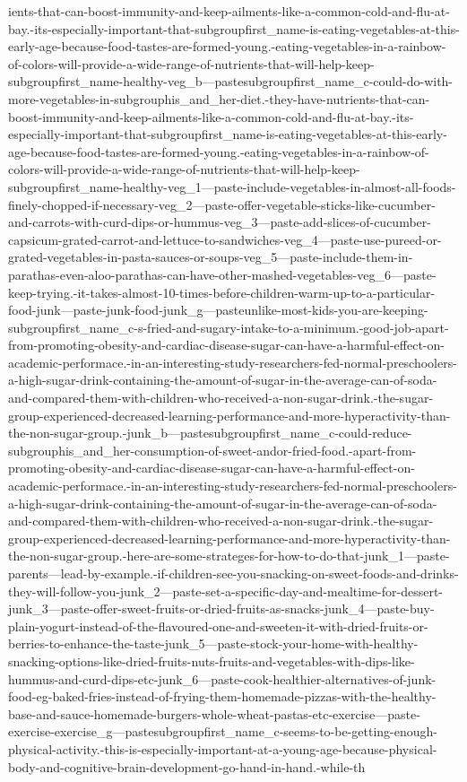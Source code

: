 \documentclass[]{article}
\begin{document}
ients-that-can-boost-immunity-and-keep-ailments-like-a-common-cold-and-flu-at-bay.-its-especially-important-that-subgroupfirst_name-is-eating-vegetables-at-this-early-age-because-food-tastes-are-formed-young.-eating-vegetables-in-a-rainbow-of-colors-will-provide-a-wide-range-of-nutrients-that-will-help-keep-subgroupfirst_name-healthy-veg_b---pastesubgroupfirst_name_c-could-do-with-more-vegetables-in-subgrouphis_and_her-diet.-they-have-nutrients-that-can-boost-immunity-and-keep-ailments-like-a-common-cold-and-flu-at-bay.-its-especially-important-that-subgroupfirst_name-is-eating-vegetables-at-this-early-age-because-food-tastes-are-formed-young.-eating-vegetables-in-a-rainbow-of-colors-will-provide-a-wide-range-of-nutrients-that-will-help-keep-subgroupfirst_name-healthy-veg_1---paste-include-vegetables-in-almost-all-foods-finely-chopped-if-necessary-veg_2---paste-offer-vegetable-sticks-like-cucumber-and-carrots-with-curd-dips-or-hummus-veg_3---paste-add-slices-of-cucumber-capsicum-grated-carrot-and-lettuce-to-sandwiches-veg_4---paste-use-pureed-or-grated-vegetables-in-pasta-sauces-or-soups-veg_5---paste-include-them-in-parathas-even-aloo-parathas-can-have-other-mashed-vegetables-veg_6---paste-keep-trying.-it-takes-almost-10-times-before-children-warm-up-to-a-particular-food-junk---paste-junk-food-junk_g---pasteunlike-most-kids-you-are-keeping-subgroupfirst_name_c-s-fried-and-sugary-intake-to-a-minimum.-good-job-apart-from-promoting-obesity-and-cardiac-disease-sugar-can-have-a-harmful-effect-on-academic-performace.-in-an-interesting-study-researchers-fed-normal-preschoolers-a-high-sugar-drink-containing-the-amount-of-sugar-in-the-average-can-of-soda-and-compared-them-with-children-who-received-a-non-sugar-drink.-the-sugar-group-experienced-decreased-learning-performance-and-more-hyperactivity-than-the-non-sugar-group.-junk_b---pastesubgroupfirst_name_c-could-reduce-subgrouphis_and_her-consumption-of-sweet-andor-fried-food.-apart-from-promoting-obesity-and-cardiac-disease-sugar-can-have-a-harmful-effect-on-academic-performace.-in-an-interesting-study-researchers-fed-normal-preschoolers-a-high-sugar-drink-containing-the-amount-of-sugar-in-the-average-can-of-soda-and-compared-them-with-children-who-received-a-non-sugar-drink.-the-sugar-group-experienced-decreased-learning-performance-and-more-hyperactivity-than-the-non-sugar-group.-here-are-some-strateges-for-how-to-do-that-junk_1---paste-parents---lead-by-example.-if-children-see-you-snacking-on-sweet-foods-and-drinks-they-will-follow-you-junk_2---paste-set-a-specific-day-and-mealtime-for-dessert-junk_3---paste-offer-sweet-fruits-or-dried-fruits-as-snacks-junk_4---paste-buy-plain-yogurt-instead-of-the-flavoured-one-and-sweeten-it-with-dried-fruits-or-berries-to-enhance-the-taste-junk_5---paste-stock-your-home-with-healthy-snacking-options-like-dried-fruits-nuts-fruits-and-vegetables-with-dips-like-hummus-and-curd-dips-etc-junk_6---paste-cook-healthier-alternatives-of-junk-food-eg-baked-fries-instead-of-frying-them-homemade-pizzas-with-the-healthy-base-and-sauce-homemade-burgers-whole-wheat-pastas-etc-exercise---paste-exercise-exercise_g---pastesubgroupfirst_name_c-seems-to-be-getting-enough-physical-activity.-this-is-especially-important-at-a-young-age-because-physical-body-and-cognitive-brain-development-go-hand-in-hand.-while-th
\end{document}

